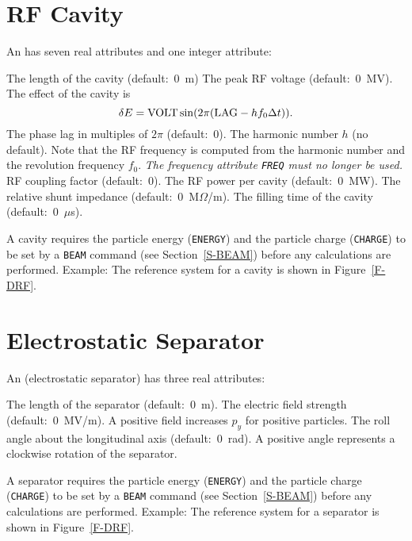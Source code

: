 \section{RF Cavity}
\label{S-RF}
An  has seven real attributes and one integer attribute:
\begin{mylist}
The length of the cavity (default:~0~m)
The peak RF voltage (default:~0~MV).
The effect of the cavity is
\[
   \delta E={\rm VOLT} \sin(2\pi({\rm LAG}- h f_{0} \Delta t)).
\]
The phase lag in multiples of \(2\pi\) (default:~0).
The harmonic number \(h\) (no default).
Note that the RF frequency is computed from the harmonic number
and the revolution frequency \(f_{0}\).
{\em The frequency attribute {\tt FREQ} must no longer be used.}
RF coupling factor (default:~0).
The RF power per cavity (default:~0~MW).
The relative shunt impedance (default:~0~M\(\Omega\)/m).
The filling time of the cavity (default:~0~\(\mu\)s).
\end{mylist}
A cavity requires the particle energy ({\tt ENERGY})
and the particle charge ({\tt CHARGE})
to be set by a {\tt BEAM} command (see Section~\ref{S-BEAM})
before any calculations are performed.
Example:
The reference system for a cavity is shown in Figure~\ref{F-DRF}.
 
\section{Electrostatic Separator}
\label{S-ELSE}
An  (electrostatic separator) has three real
attributes:
\begin{mylist}
The length of the separator (default:~0~m).
The electric field strength (default:~0~MV/m).
A positive field increases \(p_{y}\) for positive particles.
The roll angle about the longitudinal axis (default:~0~rad).
A positive angle represents a clockwise rotation of the separator.
\end{mylist}
A separator requires the particle energy ({\tt ENERGY})
and the particle charge ({\tt CHARGE})
to be set by a {\tt BEAM} command (see Section~\ref{S-BEAM})
before any calculations are performed.
Example:
The reference system for a separator is shown in Figure~\ref{F-DRF}.
 
